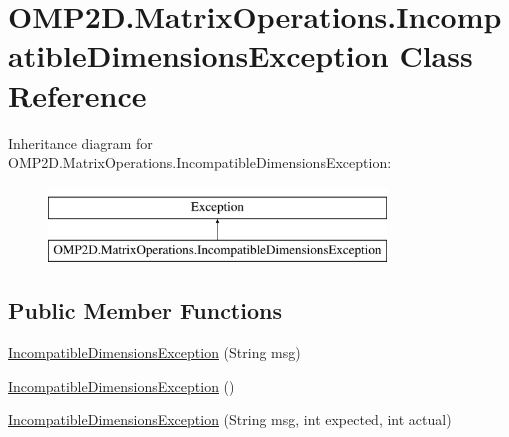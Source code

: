 \hypertarget{classOMP2D_1_1MatrixOperations_1_1IncompatibleDimensionsException}{\section{O\-M\-P2\-D.\-Matrix\-Operations.\-Incompatible\-Dimensions\-Exception Class Reference}
\label{classOMP2D_1_1MatrixOperations_1_1IncompatibleDimensionsException}
}
Inheritance diagram for O\-M\-P2\-D.\-Matrix\-Operations.\-Incompatible\-Dimensions\-Exception\-:\begin{figure}[H]
\begin{center}
\leavevmode
\includegraphics[height=2.000000cm]{classOMP2D_1_1MatrixOperations_1_1IncompatibleDimensionsException}
\end{center}
\end{figure}
\subsection*{Public Member Functions}
\begin{DoxyCompactItemize}
\item 
\hyperlink{classOMP2D_1_1MatrixOperations_1_1IncompatibleDimensionsException_a0e5a16dc4643385797385418e494d309}{Incompatible\-Dimensions\-Exception} (String msg)
\item 
\hyperlink{classOMP2D_1_1MatrixOperations_1_1IncompatibleDimensionsException_aae52cccef243d78d596309dd46d084b2}{Incompatible\-Dimensions\-Exception} ()
\item 
\hyperlink{classOMP2D_1_1MatrixOperations_1_1IncompatibleDimensionsException_a1d8c5075cfc4c1a2efda645ac3b48ec4}{Incompatible\-Dimensions\-Exception} (String msg, int expected, int actual)
\end{DoxyCompactItemize}


